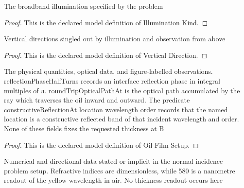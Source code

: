 \begin{definition}
  \label{def:physics:phyx-mini-0151:phyxminiproblems-problemphyxmini0151-illuminationkind}
  The broadband illumination specified by the problem
\end{definition}
\begin{proof}
  This is the declared model definition of Illumination Kind.
\end{proof}
\begin{definition}
  \label{def:physics:phyx-mini-0151:phyxminiproblems-problemphyxmini0151-verticaldirection}
  Vertical directions singled out by illumination and observation from above
\end{definition}
\begin{proof}
  This is the declared model definition of Vertical Direction.
\end{proof}
\begin{definition}
  \label{def:physics:phyx-mini-0151:phyxminiproblems-problemphyxmini0151-oilfilmsetup}
  The physical quantities, optical data, and figure-labelled observations. reflectionPhaseHalfTurns records an interface reflection phase in integral multiples of π. roundTripOpticalPathAt is the optical path accumulated by the ray which traverses the oil inward and outward. The predicate constructiveReflectionAt location wavelength order records that the named location is a constructive reflected band of that incident wavelength and order. None of these fields fixes the requested thickness at B
\end{definition}
\begin{proof}
  This is the declared model definition of Oil Film Setup.
\end{proof}
\begin{definition}
  \label{def:physics:phyx-mini-0151:phyxminiproblems-problemphyxmini0151-hasproblemreadouts}
  Numerical and directional data stated or implicit in the normal-incidence problem setup. Refractive indices are dimensionless, while 580 is a nanometre readout of the yellow wavelength in air. No thickness readout occurs here
\end{definition}

